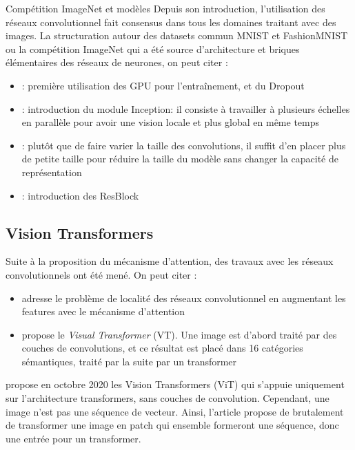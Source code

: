 \documentclass{beamer}
\begin{document}
\begin{frame}{}{Compétition ImageNet et modèles}
	Depuis son introduction, l'utilisation des réseaux convolutionnel \cite{lecun1998gradient} fait consensus dans tous les domaines traitant avec des images. La structuration autour des datasets commun MNIST et FashionMNIST \cite{lecun2010mnist,fashionMNIST} ou la compétition ImageNet qui a été source d'architecture et briques élémentaires des réseaux de neurones, on peut citer : \newline
	
	\pause %
	
	\begin{itemize}
		\item {} \cite{krizhevsky2012imagenet} : première utilisation des GPU pour l'entraînement, et du Dropout
		\item {} \cite{szegedy2015going} : introduction du module Inception: il consiste à travailler à plusieurs échelles en parallèle pour avoir une vision locale et plus global en même temps
		\item {} \cite{simonyan2014very} : plutôt que de faire varier la taille des convolutions, il suffit d'en placer plus de petite taille pour réduire la taille du modèle sans changer la capacité de représentation
		\item {} \cite{he2016deep} : introduction des ResBlock
	\end{itemize}
\end{frame}

\subsection{Vision Transformers}

\begin{frame}{}{}
	Suite à la proposition du mécanisme d'attention, des travaux avec les réseaux convolutionnels ont été mené. On peut citer :

	\begin{itemize}
		\item \cite{bello2019attention} adresse le problème de localité des réseaux convolutionnel en augmentant les features avec le mécanisme d'attention
		\item \cite{wu2020visual} propose le \textit{Visual Transformer} (VT). Une image est d'abord traité par des couches de convolutions, et ce résultat est placé dans 16 catégories sémantiques, traité par la suite par un transformer
	\end{itemize}
	
	\cite{dosovitskiy2020image} propose en octobre 2020 les Vision Transformers (ViT) qui s'appuie uniquement sur l'architecture transformers, sans couches de convolution. Cependant, une image n'est pas une séquence de vecteur. Ainsi, l'article propose de brutalement de transformer une image en patch qui ensemble formeront une séquence, donc une entrée pour un transformer.
\end{frame}
\end{document}
